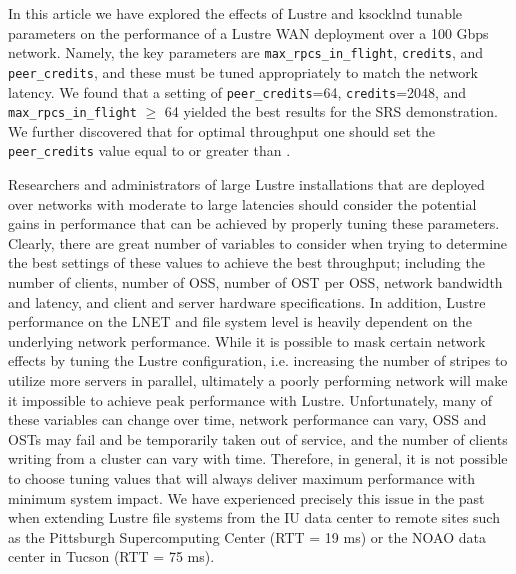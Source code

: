 \documentclass[]{sig-alternate}
\begin{document}
In this article we have explored the effects of Lustre and ksocklnd tunable parameters on the performance of a
Lustre WAN deployment over a 100 Gbps network. Namely, the key parameters are {\tt max\_rpcs\_in\_flight},
{\tt credits}, and {\tt peer\_credits}, and these must be tuned appropriately to match the network latency. We
found that a setting of {\tt peer\_credits}=64, {\tt credits}=2048, and {\tt max\_rpcs\_in\_flight} $\geq$ 64
yielded the best results for the SRS demonstration. We further discovered that for optimal throughput one
should set the {\tt peer\_credits} value equal to or greater than .

Researchers and administrators of large Lustre installations that are deployed over networks with moderate to
large latencies should consider the potential gains in performance that can be achieved by properly tuning
these parameters. Clearly, there are great number of variables to consider when trying to determine the best
settings of these values to achieve the best throughput; including the number of clients, number of OSS,
number of OST per OSS, network bandwidth and latency, and client and server hardware specifications. In
addition, Lustre performance on the LNET and file system level is heavily dependent on the underlying network
performance. While it is possible to mask certain network effects by tuning the Lustre configuration,
i.e. increasing the number of stripes to utilize more servers in parallel, ultimately a poorly performing
network will make it impossible to achieve peak performance with Lustre. Unfortunately, many of these
variables can change over time, network performance can vary, OSS and OSTs may fail and be temporarily taken
out of service, and the number of clients writing from a cluster can vary with time. Therefore, in general, it
is not possible to choose tuning values that will always deliver maximum performance with minimum system
impact. We have experienced precisely this issue in the past when extending Lustre file systems from the IU
data center to remote sites such as the Pittsburgh Supercomputing Center (RTT = 19 ms) or the NOAO data
center in Tucson (RTT = 75 ms).
\end{document}
